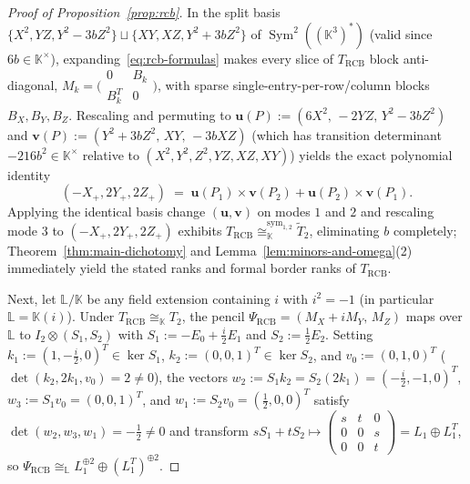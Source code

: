 \documentclass[11pt,reqno]{amsart}
\theoremstyle{definition}
\theoremstyle{remark}
\numberwithin{equation}{section}
\newcommand{\KK}{\mathbb{K}}
\newcommand{\LL}{\mathbb{L}}
\DeclareMathOperator{\Sym}{Sym}
\begin{document}
\begin{proof}[Proof of Proposition~\ref{prop:rcb}]
In the split basis $\{X^2, YZ, Y^2 - 3bZ^2\} \sqcup \{XY, XZ, Y^2 + 3bZ^2\}$ of $\Sym^2((\KK^3)^*)$ (valid since $6b \in \KK^\times$), expanding~\eqref{eq:rcb-formulas} makes every slice of $T_{\mathrm{RCB}}$ block anti-diagonal, $M_k = \bigl(\begin{smallmatrix} 0 & B_k \\ B_k^T & 0 \end{smallmatrix}\bigr)$, with sparse single-entry-per-row/column blocks $B_X, B_Y, B_Z$. Rescaling and permuting to $\mathbf{u}(P) := (6X^2,\, -2YZ,\, Y^2 - 3bZ^2)$ and $\mathbf{v}(P) := (Y^2 + 3bZ^2,\, XY,\, -3bXZ)$ (which has transition determinant $-216 b^2 \in \KK^\times$ relative to $(X^2, Y^2, Z^2, YZ, XZ, XY)$) yields the exact polynomial identity
\begin{equation}\label{eq:rcb-cross}
  (-X_+, 2Y_+, 2Z_+) \;=\; \mathbf{u}(P_1) \times \mathbf{v}(P_2) + \mathbf{u}(P_2) \times \mathbf{v}(P_1).
\end{equation}
Applying the identical basis change $(\mathbf{u}, \mathbf{v})$ on modes $1$ and $2$ and rescaling mode $3$ to $(-X_+, 2Y_+, 2Z_+)$ exhibits $T_{\mathrm{RCB}} \cong_{\KK}^{\mathrm{sym}_{1,2}} \widetilde{T}_2$, eliminating $b$ completely; Theorem~\ref{thm:main-dichotomy} and Lemma~\ref{lem:minors-and-omega}(2) immediately yield the stated ranks and formal border ranks of $T_{\mathrm{RCB}}$.

Next, let $\LL/\KK$ be any field extension containing $i$ with $i^2 = -1$ (in particular $\LL = \KK(i)$). Under $T_{\mathrm{RCB}} \cong_{\KK} T_2$, the pencil $\Psi_{\mathrm{RCB}} = (M_X + i M_Y,\, M_Z)$ maps over $\LL$ to $I_2 \otimes (S_1, S_2)$ with $S_1 := -E_0 + \frac{i}{2}E_1$ and $S_2 := \frac{1}{2}E_2$. Setting $k_1 := (1, -\frac{i}{2}, 0)^T \in \ker S_1$, $k_2 := (0, 0, 1)^T \in \ker S_2$, and $v_0 := (0, 1, 0)^T$ ($\det(k_2, 2k_1, v_0) = 2 \neq 0$), the vectors $w_2 := S_1 k_2 = S_2(2k_1) = (-\frac{i}{2}, -1, 0)^T$, $w_3 := S_1 v_0 = (0, 0, 1)^T$, and $w_1 := S_2 v_0 = (\frac{1}{2}, 0, 0)^T$ satisfy $\det(w_2, w_3, w_1) = -\frac{1}{2} \neq 0$ and transform $s S_1 + t S_2 \mapsto \left(\begin{smallmatrix} s & t & 0 \\ 0 & 0 & s \\ 0 & 0 & t \end{smallmatrix}\right) = L_1 \oplus L_1^T$, so $\Psi_{\mathrm{RCB}} \cong_{\LL} L_1^{\oplus 2} \oplus (L_1^T)^{\oplus 2}$.


\end{proof}
\end{document}
